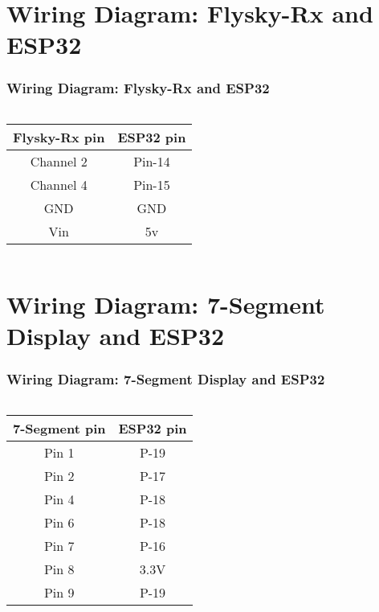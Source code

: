 \documentclass{beamer}
\begin{document}
\section{Wiring Diagram: Flysky-Rx and ESP32}
\begin{frame}
\frametitle{Wiring Diagram: Flysky-Rx and ESP32}
\begin{columns}
  
  \begin{tabular} { | c  | c  |  }
\hline
\textbf{Flysky-Rx pin} & \textbf{ESP32 pin} \\
\hline
Channel 2 & Pin-14  \\
\hline
Channel 4 & Pin-15\\
\hline
GND & GND  \\
\hline
Vin & 5v\\
\hline
\end{tabular}


  
 
  
\end{columns}



\end{frame}

\section{Wiring Diagram: 7-Segment Display and ESP32}
\begin{frame}
\frametitle{Wiring Diagram: 7-Segment Display and ESP32}
\begin{columns}
  
  \begin{tabular} { | c  | c  |  }
\hline
\textbf{7-Segment pin} & \textbf{ESP32 pin} \\
\hline
Pin 1 & P-19\\
\hline
Pin 2 & P-17\\
\hline
Pin 4 & P-18\\
\hline
Pin 6 & P-18\\
\hline
Pin 7 & P-16  \\
\hline
Pin 8 & 3.3V\\
\hline
Pin 9 & P-19\\
\hline

\end{tabular}


  
 
  
\end{columns}



\end{frame}
\end{document}
